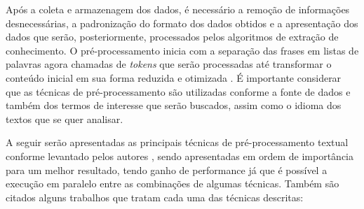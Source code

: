 Após a coleta e armazenagem dos dados, é necessário a remoção de informações desnecessárias, a padronização do formato dos dados obtidos e a apresentação dos dados que serão, posteriormente, processados pelos algoritmos de extração de conhecimento. O pré-processamento inicia com a separação das frases em listas de palavras agora chamadas de \textit{tokens} que serão processadas até transformar o conteúdo inicial em sua forma reduzida e otimizada \cite{SYMEONIDIS2018298}. É importante considerar que as técnicas de pré-processamento são utilizadas conforme a fonte de dados e também dos termos de interesse que serão buscados, assim como o idioma dos textos que se quer analisar. 

A seguir serão apresentadas as principais técnicas de pré-processamento textual conforme levantado pelos autores , sendo apresentadas em ordem de importância para um melhor resultado, tendo ganho de performance já que é possível a execução em paralelo entre as combinações de algumas técnicas. Também são citados alguns trabalhos que tratam cada uma das técnicas descritas:

